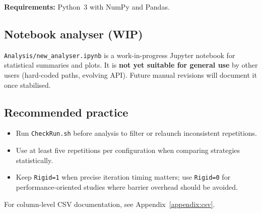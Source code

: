\textbf{Requirements:} Python~3 with NumPy and Pandas.

\subsection{Notebook analyser (WIP)}

\texttt{Analysis/new\_analyser.ipynb} is a work-in-progress Jupyter notebook for statistical summaries and plots. It is \textbf{not yet suitable for general use} by other users (hard-coded paths, evolving API). Future manual revisions will document it once stabilised.

\subsection{Recommended practice}

\begin{itemize}
  \item Run \texttt{CheckRun.sh} before analysis to filter or relaunch inconsistent repetitions.
  \item Use at least five repetitions per configuration when comparing strategies statistically.
  \item Keep \texttt{Rigid=1} when precise iteration timing matters; use \texttt{Rigid=0} for performance-oriented studies where barrier overhead should be avoided.
\end{itemize}

For column-level CSV documentation, see Appendix~\ref{appendix:csv}.
